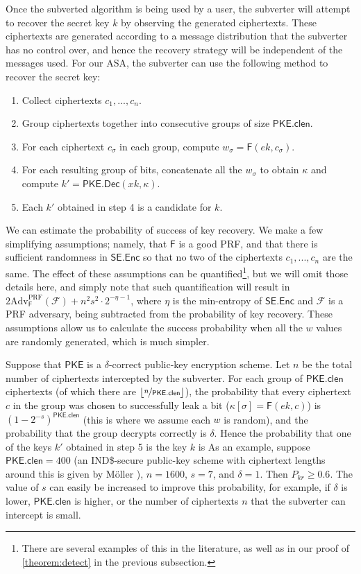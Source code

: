 Once the subverted algorithm is being used by a user, the subverter will attempt to recover the secret key $k$ by observing the generated ciphertexts. These ciphertexts are generated according to a message distribution that the subverter has no control over, and hence the recovery strategy will be independent of the messages used. For our ASA, the subverter can use the following method to recover the secret key:
\begin{enumerate}\itemsep0em
\item Collect ciphertexts $c_1,...,c_n$.
\item Group ciphertexts together into consecutive groups of size $\mathsf{PKE.clen}$.
\item For each ciphertext $c_\sigma$ in each group, compute $w_\sigma = \mathsf{F}(ek, c_\sigma)$.
\item For each resulting group of bits, concatenate all the $w_\sigma$ to obtain $\kappa$ and compute $k'=\mathsf{PKE.Dec}(xk,\kappa)$.
\item Each $k'$ obtained in step 4 is a candidate for $k$.
\end{enumerate}

We can estimate the probability of success of key recovery. We make a few simplifying assumptions; namely, that $\mathsf{F}$ is a good PRF, and that there is sufficient randomness in $\mathsf{SE.Enc}$ so that no two of the ciphertexts $c_1,...,c_n$ are the same. The effect of these assumptions can be quantified\footnote{There are several examples of this in the literature, as well as in our proof of \autoref{theorem:detect} in the previous subsection.}, but we will omit those details here, and simply note that such quantification will result in $2\text{Adv}^{\mathrm{PRF}}_\mathsf{F}(\mathcal{F})+n^2s^2\cdot 2^{-\eta-1}$, where $\eta$ is the min-entropy of $\mathsf{SE.Enc}$ and $\mathcal{F}$ is a PRF adversary, being subtracted from the probability of key recovery. These assumptions allow us to calculate the success probability when all the $w$ values are randomly generated, which is much simpler.

Suppose that $\mathsf{PKE}$ is a $\delta$-correct public-key encryption scheme. Let $n$ be the total number of ciphertexts intercepted by the subverter. For each group of $\mathsf{PKE.clen}$ ciphertexts (of which there are $\lfloor \nicefrac{n}{\mathsf{PKE.clen}} \rfloor$), the probability that every ciphertext $c$ in the group was chosen to successfully leak a bit ($\kappa[\sigma]=\mathsf{F}(ek,c)$) is $(1-2^{-s})^\mathsf{PKE.clen}$ (this is where we assume each $w$ is random), and the probability that the group decrypts correctly is $\delta$. Hence the probability that one of the keys $k'$ obtained in step 5 is the key $k$ is
As an example, suppose $\mathsf{PKE.clen}=400$ (an IND\$-secure public-key scheme with ciphertext lengths around this is given by Möller \cite{ESORICS:Moller04}), $n=1600$, $s=7$, and $\delta=1$. Then $P_{kr}\ge 0.6$. The value of $s$ can easily be increased to improve this probability, for example, if $\delta$ is lower, $\mathsf{PKE.clen}$ is higher, or the number of ciphertexts $n$ that the subverter can intercept is small.

